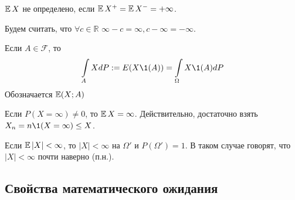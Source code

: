    \begin{nb}
        $\operatorname*{\mathbb{E}} X$ не определено, если $\operatorname*{\mathbb{E}} X^{+}=\operatorname*{\mathbb{E}} X^{-}=+\infty$.
    \end{nb}
    
    \begin{nb}
        Будем считать, что $\forall c\in\mathbb{R}$ $\infty -c=\infty, c-\infty =-\infty$.
    \end{nb}
    
    \begin{definition}\label{lect07:def5}
        Если $A\in\mathcal{F}$, то
        $$
            \int\limits_{A}X dP := E(X\1 (A)) = \int\limits_{\Omega}X\1 (A) dP
        $$
        Обозначается $\operatorname*{\mathbb{E}} (X;A)$
    \end{definition}
    
    \begin{nb}
        Если $P(X=\infty)\neq 0$, то $\operatorname*{\mathbb{E}} X=\infty$. Действительно, достаточно взять $X_n = n\1 (X=\infty)\le X$.
    \end{nb}
    
    \begin{nb}
        Если $\operatorname*{\mathbb{E}} |X|<\infty$, то $|X|<\infty$ на $\Omega '$ и $P(\Omega ') = 1$. В таком случае говорят, что $|X|<\infty$ почти наверно (п.н.).
    \end{nb}
    
    \subsection{Свойства математического ожидания}
    

